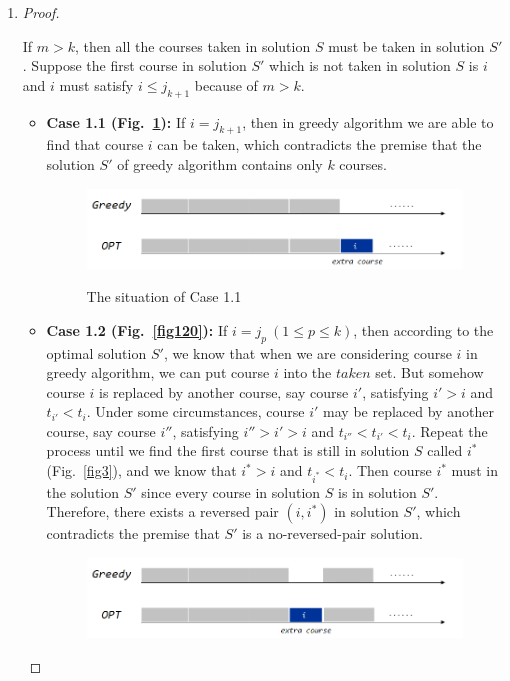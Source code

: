 \documentclass[12pt,a4paper]{article}
\makeatletter
\newtheorem*{solution}{Solution}
\theoremstyle{definition}
\renewenvironment{solution}[1][Solution] {\par\pushQED{\qed}\normalfont\topsep6\p@\@plus6\p@\relax\trivlist\item[\hskip\labelsep\bfseries#1\@addpunct{.}]\ignorespaces}{\popQED\endtrivlist\@endpefalse} \makeatother
\makeatother
\begin{document}
\begin{enumerate}
\begin{solution}
\begin{proof}
\begin{itemize}
            If $m > k$, then all the courses taken in solution $S$ must be taken in solution $S'$. Suppose the first course in solution $S'$ which is not taken in solution $S$ is $i$ and $i$ must satisfy $i \leq j_{k+1}$ because of $m > k$.
            \begin{itemize}
            \item \textbf{Case 1.1 (Fig.~\ref{fig11}):} If $i = j_{k+1}$, then in greedy algorithm we are able to find that course $i$ can be taken, which contradicts the premise that the solution $S'$ of greedy algorithm contains only $k$ courses.
            \begin{figure}[h]
            \centering
            \includegraphics[width=4.2in]{problem3-case1-1.png}\\
            \caption{The situation of Case 1.1}\label{fig11}
            \end{figure}
            \item \textbf{Case 1.2 (Fig.~\ref{fig120}):} If $i = j_p\ (1 \leq p \leq k)$, then according to the optimal solution $S'$, we know that when we are considering course $i$ in greedy algorithm, we can put course $i$ into the $taken$ set. But somehow course $i$ is replaced by another course, say course $i'$, satisfying $i' > i$ and $t_{i'} < t_i$. Under some circumstances, course $i'$ may be replaced by another course, say course $i''$, satisfying $i'' > i' > i$ and $t_{i''} < t_{i'} < t_i$. Repeat the process until we find the first course that is still in solution $S$ called $i^*$ (Fig.~\ref{fig3}), and we know that $i^* > i$ and $t_{i^*} < t_i$. Then course $i^*$ must in the solution $S'$ since every course in solution $S$ is in solution $S'$. Therefore, there exists a reversed pair $(i, i^*)$ in solution $S'$, which contradicts the premise that $S'$ is a no-reversed-pair solution.
            \begin{figure}[h]
            \centering
            \includegraphics[width=4.2in]{problem3-case1-2-0.png}\\

\end{figure}
\end{itemize}
\end{itemize}
\end{proof}
\end{solution}
\end{enumerate}
\end{document}
